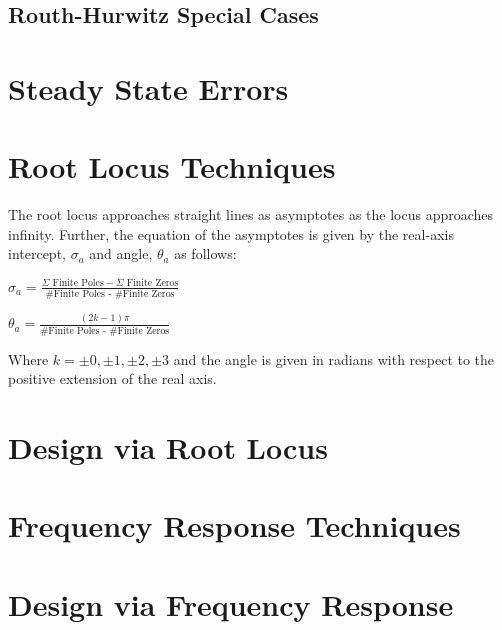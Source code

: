 \documentclass[11pt]{article}
\begin{document}
    \subsection{Routh-Hurwitz Special Cases}
    \section{Steady State Errors}
    \section{Root Locus Techniques}
    
    The root locus approaches straight lines as asymptotes as the locus approaches infinity. Further, the equation of the asymptotes is given by the real-axis intercept, $\sigma_a$ and angle, $\theta_a$ as follows:
    \begin{center}
        $\sigma_a = \frac{\Sigma \text{ Finite Poles} - \Sigma \text{ Finite Zeros}}{\text{\# Finite Poles - \# Finite Zeros}}$ 
    \end{center}

    \begin{center}
        $\theta_a = \frac{(2k - 1)\pi}{\text{\# Finite Poles - \# Finite Zeros}}$ 
    \end{center}

    Where $k = \pm 0, \pm 1, \pm 2, \pm 3$ and the angle is given in radians with respect to the positive
extension of the real axis.
    \section{Design via Root Locus}
    \section{Frequency Response Techniques}
    \section{Design via Frequency Response}
    
    
\end{document}
